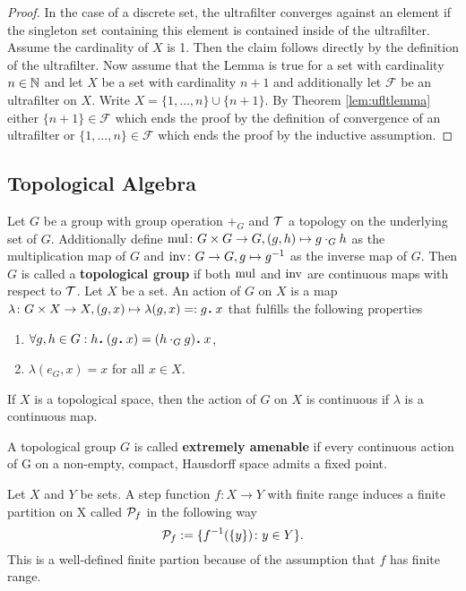 \begin{proof}
  In the case of a discrete set, the ultrafilter converges against an element if the singleton set containing this element is contained inside of the ultrafilter.
  Assume the cardinality of $X$ is 1. Then the claim follows directly by the definition of the ultrafilter.
Now assume that the Lemma is true for a set with cardinality $n \in \N$ and let $X$ be a set with cardinality $n+1$ and additionally let $\mathcal{F}$ be an ultrafilter on $X$. Write $X = \{1, \ldots, n\} \cup \{n+1\}$. By Theorem \ref{lem:ufltlemma} either $\{n+1\} \in \mathcal{F}$ which ends the proof by the definition of convergence of an ultrafilter or $\{1,\ldots,n\} \in \mathcal{F}$ which ends the proof by the inductive assumption.
\end{proof}

\subsection{Topological Algebra}

\begin{defin}
  Let $G$ be a group with group operation $+_G$ and $\T$ a topology on the underlying set of $G$. Additionally define ${\rm mul}\colon G \times G \to G, (g, h) \mapsto g \cdot_G h$ as the multiplication map of $G$ and ${\rm inv}\colon G \to G, g \mapsto g^{-1}$ as the inverse map of $G$. Then $G$ is called a \textbf{topological group} if both ${\rm mul}$ and ${\rm inv}$ are continuous maps with respect to $\T$.
  Let $X$ be a set. An action of $G$ on $X$ is a map $\lambda\colon G\times X \to X, (g, x) \mapsto \lambda(g, x) =: g \anddot x$ that fulfills the following properties
  \begin{enumerate}
    \item $\forall g, h \in G: h \anddot (g \anddot x) = (h \cdot_G g) \anddot x$,
    \item $\lambda(e_G, x) = x$ for all $x \in X$.
  \end{enumerate}
  If $X$ is a topological space, then the action of $G$ on $X$ is continuous if $\lambda$ is a continuous map.
\end{defin}

\begin{defin}
  A topological group $G$ is called \textbf{extremely amenable} if every continuous action of G on a non-empty, compact, Hausdorff space admits a fixed point.
\end{defin}

\begin{defin}
  Let $X$ and $Y$ be sets. A step function $f\colon X \to Y$ with finite range induces a finite partition on X called $\P_f$ in the following way
  \begin{equation*}
    \P_f := \{f^{-1}(\{y\})\colon y \in Y\}.
  \end{equation*}
  This is a well-defined finite partion because of the assumption that $f$ has finite range.
\end{defin}

